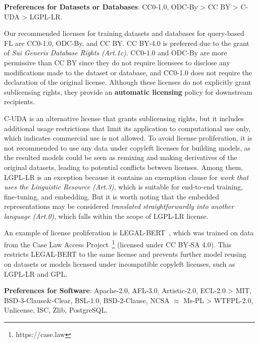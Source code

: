 \textbf{Preferences for Datasets or Databases}: CC0-1.0, ODC-By > CC BY > C-UDA > LGPL-LR.
   
  Our recommended licenses for training datasets and databases for query-based FL are CC0-1.0, ODC-By, and CC BY. CC BY-4.0 is preferred due to the grant of \textit{Sui Generis Database Rights (Art.1c)}. 
  CC0-1.0 and ODC-By are more permissive than CC BY since they do not require licensees to disclose any modifications made to the dataset or database, and CC0-1.0 does not require the declaration of the original license. 
  Although these licenses do not explicitly grant sublicensing rights, they provide an \textbf{automatic licensing} policy for downstream recipients.
  
  C-UDA is an alternative license that grants sublicensing rights, but it includes additional usage restrictions that limit its application to computational use only, which indicates commercial use is not allowed.
  To avoid license proliferation, it is not recommended to use any data under copyleft licenses for building models, as the resulted models could be seen as remixing and making derivatives of the original datasets, leading to potential conflicts between licenses.
  Among them, LGPL-LR is an exception because it contains an exemption clause for \textit{work that uses the Linguistic Resource (Art.3)}, which is suitable for end-to-end training, fine-tuning, and embedding. 
  But it is worth noting that the embedded representations may be considered \textit{translated straightforwardly into another language (Art.0)}, which falls within the scope of LGPL-LR license.
  
  An example of license proliferation is LEGAL-BERT~\cite{chalkidis2020legal}, which was trained on data from the Case Law Access Project~\footnote{https://case.law} (licensed under CC BY-SA 4.0). This restricts LEGAL-BERT to the same license and prevents further model reusing on datasets or models licensed under incompatible copyleft licenses, such as LGPL-LR and GPL.

  \textbf{Preferences for Software}: Apache-2.0, AFL-3.0, Artistic-2.0, ECL-2.0 > MIT, BSD-3-Clause\&-Clear, BSL-1.0, BSD-2-Clause, NCSA $\approx$ Ms-PL > WTFPL-2.0, Unlicense, ISC, Zlib, PostgreSQL.
  
